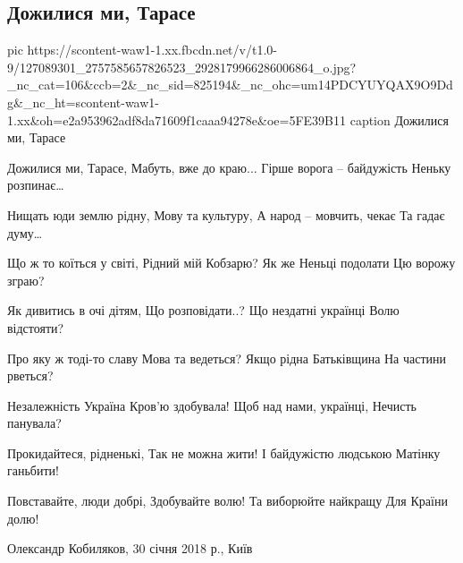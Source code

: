  
 
 
 
 
 
\subsection{Дожилися ми, Тарасе}
\label{sec:24_11_2020.fb.kobyljakov_oleksandr.1.taras}

\ifcmt
pic https://scontent-waw1-1.xx.fbcdn.net/v/t1.0-9/127089301_2757585657826523_2928179966286006864_o.jpg?_nc_cat=106&ccb=2&_nc_sid=825194&_nc_ohc=um14PDCYUYQAX9O9Ddg&_nc_ht=scontent-waw1-1.xx&oh=e2a953962adf8da71609f1caaa94278e&oe=5FE39B11
caption Дожилися ми, Тарасе
\fi

Дожилися ми, Тарасе,
Мабуть, вже до краю...
Гірше ворога – байдужість
Неньку розпинає…

Нищать юди землю рідну,
Мову та культуру,
А народ – мовчить, чекає
Та гадає думу…

Що ж то коїться у світі,
Рідний мій Кобзарю?
Як же Неньці подолати
Цю ворожу зграю?

Як дивитись в очі дітям,
Що розповідати..?
Що нездатні українці
Волю відстояти?

Про яку ж тоді-то славу
Мова та ведеться?
Якщо рідна Батьківщина
На частини рветься?

Незалежність Україна
Кров’ю здобувала!
Щоб над нами, українці,
Нечисть панувала?

Прокидайтеся, рідненькі,
Так не можна жити!
І байдужістю людською
Матінку ганьбити!

Повставайте, люди добрі,
Здобувайте волю!
Та виборюйте найкращу
Для Країни долю!

Олександр Кобиляков, 30 січня 2018 р., Київ
